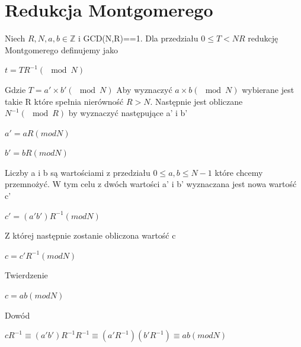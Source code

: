 \documentclass{article}
\begin{document}
\section{Redukcja Montgomerego}\label{Redukcja Montgomerego}
Niech \begin{math}R,N,a,b \in \mathbb{Z}\end{math} i GCD(N,R)==1. Dla przedziału  \begin{math}0 \leq T< NR \end{math} redukcję Montgomerego definujemy jako 
\begin{center}
    \begin{math}
        t=TR^{-1}(\mod N)
    \end{math}
\end{center}
Gdzie \begin{math}
    T= a'\times b' (\mod N)
\end{math}
\newline
Aby wyznaczyć \begin{math} a \times b (\mod N) \end{math}
wybierane jest takie R które spełnia nierówność \begin{math}R>N\end{math}. Następnie jest obliczane \begin{math}N^{-1}(\mod R)\end{math} by wyznaczyć następujące a' i b'
\begin{center}
    \begin{math}
        a' = aR(mod N)
    \end{math}
\end{center}
\begin{center}
    \begin{math}
        b' = bR(mod N)
    \end{math}
\end{center}
Liczby a i b są wartościami z przedziału \begin{math}0\leq a,b \leq N-1\end{math} które chcemy przemnożyć. W tym celu z dwóch wartości a' i b' wyznaczana jest nowa wartość c'
\begin{center}
    \begin{math}
        c' = (a'b')R^{-1}(mod N)
    \end{math}
\end{center}
Z której następnie zostanie obliczona wartość c
\begin{center}
    \begin{math}
        c = c'R^{-1}(mod N)
    \end{math}
\end{center}
Twierdzenie
\begin{center}
    \begin{math}
        c =ab(mod N)
    \end{math}
\end{center}
Dowód
\begin{center}
    \begin{math}
        cR^{-1} \equiv (a'b')R^{-1}R^{-1} \equiv (a'R^{-1} )(b'R^{-1} ) \equiv  ab(mod N)
    \end{math}
\end{center}
\end{document}
